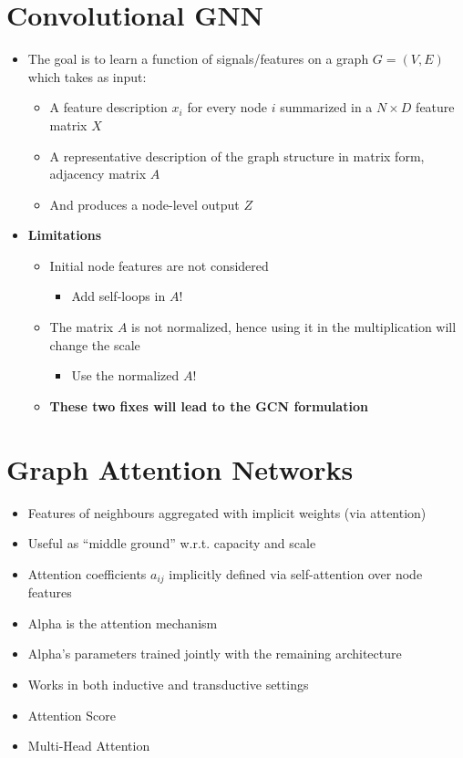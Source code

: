 \section{Convolutional GNN}
\begin{itemize}
    \item The goal is to learn a function of signals/features on a graph \(G=(V,E)\) which takes as input:
    \begin{itemize}
        \item A feature description \(x_i\) for every node \(i\) summarized in a \(N \times D\) feature matrix \(X\)
        \item A representative description of the graph structure in matrix form, adjacency matrix \(A\)
        \item And produces a node-level output \(Z\)
    \end{itemize}
    \item \textbf{Limitations}
    \begin{itemize}
        \item Initial node features are not considered
        \begin{itemize}
            \item Add self-loops in \(A\)!
        \end{itemize}
        \item The matrix \(A\) is not normalized, hence using it in the multiplication will change the scale
        \begin{itemize}
            \item Use the normalized \(A\)!
        \end{itemize}
        \item \textbf{These two fixes will lead to the GCN formulation}
    \end{itemize}
\end{itemize}

\section{Graph Attention Networks}
\begin{itemize}
    \item Features of neighbours aggregated with implicit weights (via attention)
    \item Useful as “middle ground” w.r.t. capacity and scale
    \item Attention coefficients \(a_{ij}\) implicitly defined via self-attention over node features
    \item Alpha is the attention mechanism
    \item Alpha’s parameters trained jointly with the remaining architecture
    \item Works in both inductive and transductive  settings
    \item Attention Score 
    \item Multi-Head Attention
\end{itemize}



